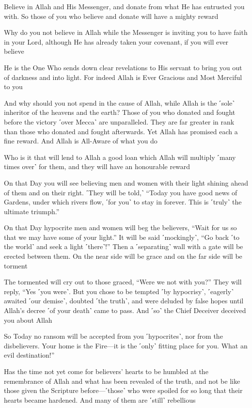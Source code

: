 Believe in Allah and His Messenger, and donate from what He has entrusted you with. So those of you who believe and donate will have a mighty reward

Why do you not believe in Allah while the Messenger is inviting you to have faith in your Lord, although He has already taken your covenant, if you will ever believe

He is the One Who sends down clear revelations to His servant to bring you out of darkness and into light. For indeed Allah is Ever Gracious and Most Merciful to you

And why should you not spend in the cause of Allah, while Allah is the ˹sole˺ inheritor of the heavens and the earth? Those of you who donated and fought before the victory ˹over Mecca˺ are unparalleled. They are far greater in rank than those who donated and fought afterwards. Yet Allah has promised each a fine reward. And Allah is All-Aware of what you do

Who is it that will lend to Allah a good loan which Allah will multiply ˹many times over˺ for them, and they will have an honourable reward

On that Day you will see believing men and women with their light shining ahead of them and on their right. ˹They will be told,˺ “Today you have good news of Gardens, under which rivers flow, ˹for you˺ to stay in forever. This is ˹truly˺ the ultimate triumph.”

On that Day hypocrite men and women will beg the believers, “Wait for us so that we may have some of your light.” It will be said ˹mockingly˺, “Go back ˹to the world˺ and seek a light ˹there˺!” Then a ˹separating˺ wall with a gate will be erected between them. On the near side will be grace and on the far side will be torment

The tormented will cry out to those graced, “Were we not with you?” They will reply, “Yes ˹you were˺. But you chose to be tempted ˹by hypocrisy˺, ˹eagerly˺ awaited ˹our demise˺, doubted ˹the truth˺, and were deluded by false hopes until Allah’s decree ˹of your death˺ came to pass. And ˹so˺ the Chief Deceiver deceived you about Allah

So Today no ransom will be accepted from you ˹hypocrites˺, nor from the disbelievers. Your home is the Fire—it is the ˹only˺ fitting place for you. What an evil destination!”

Has the time not yet come for believers’ hearts to be humbled at the remembrance of Allah and what has been revealed of the truth, and not be like those given the Scripture before—˹those˺ who were spoiled for so long that their hearts became hardened. And many of them are ˹still˺ rebellious

